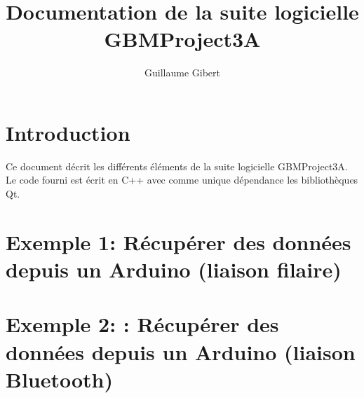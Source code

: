 \documentclass{article}
\begin{document}
\title{Documentation de la suite logicielle GBMProject3A}
\author{Guillaume Gibert}
\maketitle

\section{Introduction}
Ce document décrit les différents éléments de la suite logicielle GBMProject3A.
Le code fourni est écrit en C++ avec comme unique dépendance les bibliothèques Qt.

\section{Exemple 1: Récupérer des données depuis un Arduino (liaison filaire)}

\section{Exemple 2: : Récupérer des données depuis un Arduino (liaison Bluetooth)}

\end{document}
